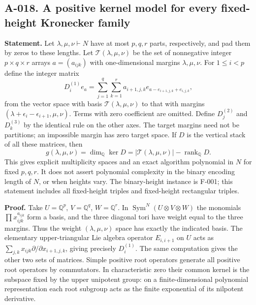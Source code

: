 \subsection*{A-018. A positive kernel model for every fixed-height Kronecker family}
\textbf{Statement.} Let $\lambda,\mu,\nu\vdash N$ have at most
$p,q,r$ parts, respectively, and pad them by zeros to these lengths.
Let $\mathcal T(\lambda,\mu,\nu)$ be the set of nonnegative integer
$p\times q\times r$ arrays $a=(a_{ijk})$ with one-dimensional margins
$\lambda,\mu,\nu$. For $1\leq i<p$ define the integer matrix
\[
 D_i^{(1)} e_a=\sum_{j=1}^q\sum_{k=1}^r a_{i+1,j,k}
 e_{a-e_{i+1,j,k}+e_{i,j,k}},
\]
from the vector space with basis $\mathcal T(\lambda,\mu,\nu)$ to
that with margins $(\lambda+\epsilon_i-\epsilon_{i+1},\mu,\nu)$.
Terms with zero coefficient are omitted. Define $D_j^{(2)}$ and
$D_k^{(3)}$ by the identical rule on the other axes. The target
margins need not be partitions; an impossible margin has zero
target space. If $D$ is the vertical stack of all these matrices,
then
\[
 \boxed{\quad g(\lambda,\mu,\nu)=\dim_{\mathbb Q}\ker D
 =|\mathcal T(\lambda,\mu,\nu)|-\operatorname{rank}_{\mathbb Q}D.\quad}
\]
This gives explicit multiplicity spaces and an exact algorithm
polynomial in $N$ for fixed $p,q,r$. It does not assert polynomial
complexity in the binary encoding length of $N$, or when heights
vary. The binary-height instance is F-001; this statement includes
all fixed-height triples and fixed-height rectangular triples.

\textbf{Proof.} Take $U=\mathbb Q^p$, $V=\mathbb Q^q$,
$W=\mathbb Q^r$. In $\operatorname{Sym}^N(U\otimes V\otimes W)$
the monomials $\prod x_{ijk}^{a_{ijk}}$ form a basis, and the three
diagonal tori have weight equal to the three margins. Thus the
weight $(\lambda,\mu,\nu)$ space has exactly the indicated basis.
The elementary upper-triangular Lie algebra operator
$E_{i,i+1}$ on $U$ acts as
$\sum_{j,k}x_{ijk}\partial/\partial x_{i+1,j,k}$, giving precisely
$D_i^{(1)}$. The same computation gives the other two sets of
matrices. Simple positive root operators generate all positive
root operators by commutators. In characteristic zero their
common kernel is the subspace fixed by the upper unipotent group:
on a finite-dimensional polynomial representation each root
subgroup acts as the finite exponential of its nilpotent
derivative.

